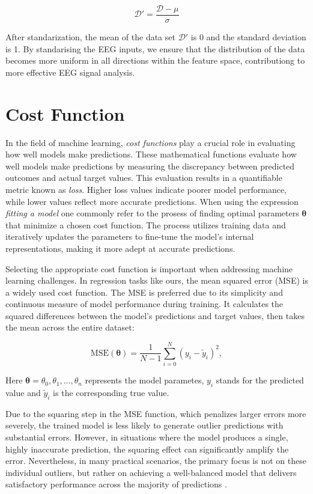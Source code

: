 \documentclass[a4paper, UKenglish, 11pt]{uiomaster}
\begin{document}
\begin{equation}
\mathcal{D}' = \frac{\mathcal{D} - \mu}{\sigma}
\end{equation}

After standarization, the mean of the data set $\mathcal{D}'$  is 0 and the standard deviation is 1. By standarising the EEG inputs, we ensure that the distribution of the data becomes more uniform in all directions within the feature space, contributiong to more effective EEG signal analysis.


\section{Cost Function}
In the field of machine learning, \emph{cost functions} play a crucial role in evaluating how well models make predictions. These mathematical functions evaluate how well models make predictions by measuring the discrepancy between predicted outcomes and actual target values. This evaluation results in a quantifiable metric known as \emph{loss}. Higher loss values indicate poorer model performance, while lower values reflect more accurate predictions. When using the expression \emph{fitting a model} one commonly refer to the prosess of finding optimal parameters $\boldsymbol{\theta}$ that minimize a chosen cost function. The process utilizes training data and iteratively updates the parameters to fine-tune the model's internal representations, making it more adept at accurate predictions.


Selecting the appropriate cost function is important when addressing machine learning challenges. In regression tasks like ours, the mean squared error (MSE) is a widely used cost function. The MSE is preferred due to its simplicity and continuous measure of model performance during training. It calculates the squared differences between the model's predictions and target values, then takes the mean across the entire dataset:

\begin{equation}
\text{MSE}(\boldsymbol{\theta}) = \frac{1}{N-1}
\sum_{i=0}^{N}(y_i-\tilde{y}_i)^2 ,
\label{eq:MSE}
\end{equation}

Here $\boldsymbol{\theta} = \theta_0, \theta_1, ..., \theta_n$ represents the model parametes, $y_i$ stands for the predicted value and $\tilde{y}_i$ is the corresponding true value.

Due to the squaring step in the MSE function, which penalizes larger errors more severely, the trained model is less likely to generate outlier predictions with substantial errors. However, in situations where the model produces a single, highly inaccurate prediction, the squaring effect can significantly amplify the error. Nevertheless, in many practical scenarios, the primary focus is not on these individual outliers, but rather on achieving a well-balanced model that delivers satisfactory performance across the majority of predictions \cite{builtin-ml-loss-functions}.
\end{document}
